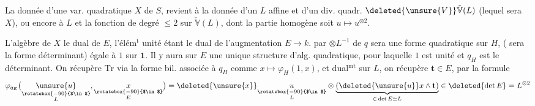 La  donnée d'une var. quadratique
$X$ de $S$, revient à la donnée d'un
 $L$ affine et d'un div. quadr.  $\deleted{\unsure{V}}\check{\mathbb V}(L)$
(lequel sera $X$), ou encore à $L$ et
la fonction de degré $\leq 2$ sur $\check{\mathbb V}(L)$,
dont la partie homogène soit $u\mapsto u^{\otimes2}$.

L'algèbre de $X$  le dual  de $E$,
l'élém$^{\mathrm t}$ unité étant le dual de l'augmentation $E\to k$.  
par $\otimes L^{-1}$ de $q$ sera une forme
quadratique sur $H$, ( sera la forme
déterminant) égale à $1$ sur $\mathbf{1}$. Il
y aura sur $E$ une unique structure
 d'alg. quadratique, pour
laquelle $1$ est unité et $q_H$ est le
déterminant. On récupère $\mathrm{Tr}$
 via la forme bil. associée à $q_H$
comme $x\mapsto\varphi_H(1,x)$, et dual$^{\mathrm{mt}}$ sur
$L$, on récupère $\mathbf{t}\in E$,  par
la formule
\[
\varphi_{q_E}\bigl(\underset{\substack{\rotatebox{-90}{$\in$}\\L}}{\unsure{u}},\underset{\substack{\rotatebox{-90}{$\in$}\\E}}{x}\bigr)
=\deleted{\unsure{x}}\underset{\substack{\rotatebox{-90}{$\in$}\\L}}{u}\otimes
\underbrace{(\deleted{\unsure{u}}x\wedge\mathbf{t})}_{\in\,\det E\simeq L}\in\deleted{\det E}=L^{\otimes 2}
\]
